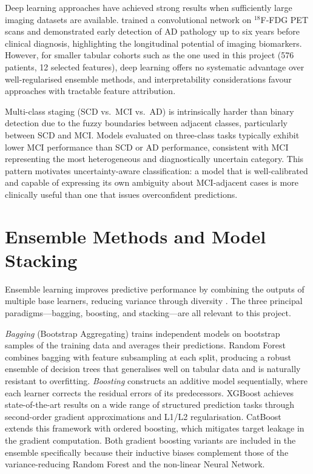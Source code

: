 \documentclass[12pt, a4paper]{report}
\begin{document}
  Deep learning approaches have achieved strong results when sufficiently large imaging
  datasets are available. \citet{ding2019deep} trained a convolutional network on
  $^{18}$F-FDG PET scans and demonstrated early detection of AD pathology up to six
  years before clinical diagnosis, highlighting the longitudinal potential of imaging
  biomarkers. However, for smaller tabular cohorts such as the one used in this
  project (576 patients, 12 selected features), deep learning offers no systematic
  advantage over well-regularised ensemble methods, and interpretability considerations
  favour approaches with tractable feature attribution.

  Multi-class staging (SCD vs.\ MCI vs.\ AD) is intrinsically harder than binary
  detection due to the fuzzy boundaries between adjacent classes, particularly between
  SCD and MCI. Models evaluated on three-class tasks typically exhibit lower MCI
  performance than SCD or AD performance, consistent with MCI representing the most
  heterogeneous and diagnostically uncertain category. This pattern motivates
  uncertainty-aware classification: a model that is well-calibrated and capable of
  expressing its own ambiguity about MCI-adjacent cases is more clinically useful than
  one that issues overconfident predictions.

  \section{Ensemble Methods and Model Stacking}
  \label{sec:ensemble}

  Ensemble learning improves predictive performance by combining the outputs of
  multiple base learners, reducing variance through diversity \citep{breiman2001random}.
  The three principal paradigms---bagging, boosting, and stacking---are all relevant
  to this project.

  \emph{Bagging} (Bootstrap Aggregating) trains independent models on bootstrap
  samples of the training data and averages their predictions. Random Forest
  \citep{breiman2001random} combines bagging with feature subsampling at each split,
  producing a robust ensemble of decision trees that generalises well on tabular data
  and is naturally resistant to overfitting. \emph{Boosting} constructs an additive
  model sequentially, where each learner corrects the residual errors of its
  predecessors. XGBoost \citep{chen2016xgboost} achieves state-of-the-art results on
  a wide range of structured prediction tasks through second-order gradient
  approximations and L1/L2 regularisation. CatBoost \citep{prokhorenkova2018catboost}
  extends this framework with ordered boosting, which mitigates target leakage in
  the gradient computation. Both gradient boosting variants are included in the
  ensemble specifically because their inductive biases complement those of the
  variance-reducing Random Forest and the non-linear Neural Network.
\end{document}
